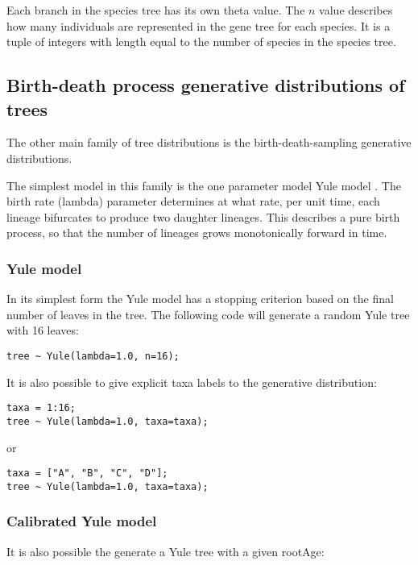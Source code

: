 \documentclass[oneside]{article}
\begin{document}
Each branch in the species tree has its own theta value.
The $n$ value describes how many individuals are represented in
the gene tree for each species.
It is a tuple of integers with length equal to the number of species
in the species tree.

\subsection{Birth-death process generative distributions of trees}

The other main family of tree distributions is the birth-death-sampling generative distributions.

The simplest model in this family is the one parameter model Yule model \cite{yule1925ii}. 
The birth rate (lambda) parameter determines at what rate, per unit time, each lineage bifurcates to produce two daughter lineages. 
This describes a pure birth process, so that the number of lineages grows monotonically forward in time. 

\subsubsection{Yule model}

In its simplest form the Yule model has a stopping criterion based on the final number of leaves in the tree. 
The following code will generate a random Yule tree with 16 leaves:

\begin{verbatim}
tree ~ Yule(lambda=1.0, n=16);
\end{verbatim}

It is also possible to give explicit taxa labels to the generative distribution:

\begin{verbatim}
taxa = 1:16;
tree ~ Yule(lambda=1.0, taxa=taxa);
\end{verbatim}

or

\begin{verbatim}
taxa = ["A", "B", "C", "D"];
tree ~ Yule(lambda=1.0, taxa=taxa);
\end{verbatim}

\subsubsection{Calibrated Yule model}

It is also possible the generate a Yule tree with a given rootAge:
\end{document}
